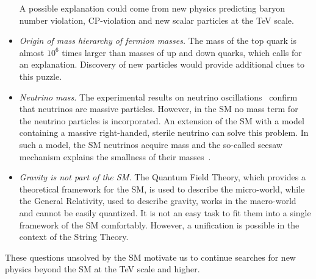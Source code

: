 \begin{itemize}
A possible explanation could come from new physics predicting baryon number violation, CP-violation and new scalar particles at the TeV scale.
\item \textit{Origin of mass hierarchy of fermion masses.} The mass of the top quark is almost $10^6$ times larger than masses of up and down quarks, which calls for an explanation. Discovery of new particles would provide additional clues to this puzzle.
\item \textit{Neutrino mass.} The experimental results on neutrino oscillations~\cite{Fukuda:1998fd} confirm that neutrinos are massive particles. However, in the SM no mass term for the neutrino particles is incorporated. An extension of the SM with a model containing a massive right-handed, sterile neutrino can solve this problem. In such a model, the SM neutrinos acquire mass and the so-called seesaw mechanism explains the smallness of their masses~\cite{Mohapatra:1979ia}.
\item \textit{Gravity is not part of the SM.} The Quantum Field Theory, which provides a theoretical framework for the SM, is used to describe the micro-world, while the General Relativity, used to describe gravity, works in the macro-world and cannot be easily quantized. It is not an easy task to fit them into a single framework of the SM comfortably. However, a unification is possible in the context of the String Theory.
\end{itemize}

These questions unsolved by the SM motivate us to continue searches for new physics beyond the SM at the TeV scale and higher.




